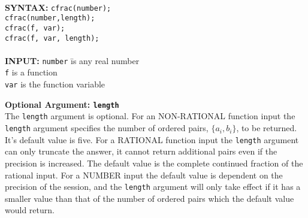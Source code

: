 \begin{tabbing}
\\
{\bf SYNTAX:} \hspace{5mm} 
\= {\tt cfrac(number);}\\
\> {\tt cfrac(number,length);}\\
\> {\tt cfrac(f, var);}\\
\> {\tt cfrac(f, var, length);}\\ \\

{\bf INPUT:}
\> {\tt number} \hspace{3mm} \= is any real number\\
\> {\tt f}                   \> is a function\\
\> {\tt var}                 \> is the function variable\\
\end{tabbing}

{\bf Optional Argument: {\tt length}}\\

The {\tt length} argument is optional. 
For an NON-RATIONAL function input the {\tt length} argument specifies
the number of ordered pairs, $\{a_i,b_i\}$, to be 
returned. It's default value is five.
For a RATIONAL function input the
{\tt length} argument can only truncate the answer, it cannot
return additional pairs even if the precision is increased.
The default value is the complete continued fraction of the
rational input. For a NUMBER input the default value is 
dependent on the precision of the session, and the
{\tt length} argument will only take effect if it has a smaller
value than that of the number of ordered pairs which the default
value would return.\\ \\




